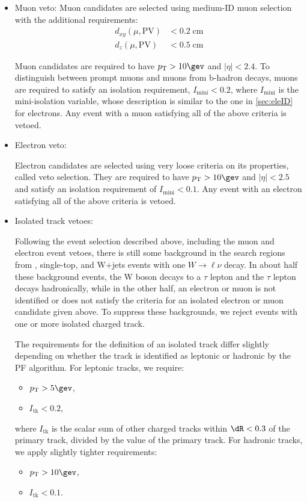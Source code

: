 \begin{itemize}
\item Muon veto:
  Muon candidates are selected using
  medium-ID muon selection \cite{Sirunyan:2018fpa} with the additional
  requirements:
  \begin{align}
    d_{xy}(\mu,\mathrm{PV}) &< 0.2\;\mathrm{cm}\nonumber\\
    d_{z}(\mu,\mathrm{PV}) &< 0.5\;\mathrm{cm}
  \end{align}

  Muon candidates are required to have $\pt>10\gev$ and $|\eta|<2.4$.
  To distinguish between prompt muons and muons from b-hadron
  decays, muons are required to satisfy an isolation requirement,
  $I_{\mathrm{mini}}<0.2$, where $I_{\mathrm{mini}}$ is the mini-isolation
  variable, whose description is similar to the one in \ref{sec:eleID} for electrons.
 Any event with a muon satisfying all of the  above criteria is vetoed.

\item Electron veto:

  Electron candidates are selected using very loose criteria on its properties, called veto selection.
  They are required to have $\pt>10\gev$ and $|\eta|<2.5$ and satisfy an isolation
  requirement of $I_{\mathrm{mini}}<0.1$. Any event with an electron satisfying all of the
  above criteria is vetoed.
\item Isolated track vetoes:
  
  Following the event selection described above,
  including the muon and electron event vetoes,
  there is still some background in the search regions from
  \ttbar, single-top, and W+jets events with one $W\rightarrow\ell\nu$
  decay.  In about half these background events, the W boson decays to a $\tau$ lepton
  and the $\tau$ lepton decays hadronically,
  while in the other half, an electron or muon is not identified
  or does not satisfy the criteria for an isolated electron or muon
  candidate given above.
  To suppress these backgrounds,
  we reject events with one or more isolated
  charged track.

  The requirements for the definition of an isolated track
  differ slightly depending on whether the track is identified
  as leptonic or hadronic by the PF algorithm.
  For leptonic tracks, we require:
  \begin{itemize}
  \item $\pt>5\gev$,
  \item $I_{\mathrm{tk}}<0.2$,
  \end{itemize}
  where $I_{\mathrm{tk}}$ is the scalar \pt sum of other
  charged tracks within $\dR<0.3$ of the primary track, divided
  by the \pt value of the primary track.
  For hadronic tracks, we apply slightly tighter requirements:
  \begin{itemize}
  \item $\pt>10\gev$,
  \item $I_{\mathrm{tk}}<0.1$.
  \end{itemize}


\end{itemize}
